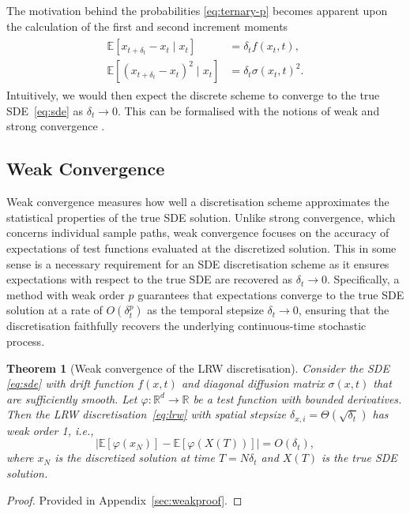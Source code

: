 \documentclass[pra,showpacs,amsmath,amssymb,amsfonts,lengthcheck,longbibliography,onecolumn]{revtex4-2}
\newcommand{\E}{\mathbb{E}}
\newtheorem{theorem}{Theorem}
\begin{document}
The motivation behind the probabilities \eqref{eq:ternary-p} becomes apparent upon the calculation of the first and second increment moments
\begin{align}\label{eq:ternary-moments}
\begin{split}
    \E[x_{t+\delta_t} - x_t \mid x_t] &= \delta_t f(x_t, t), \\
    \E[(x_{t+\delta_t} - x_t)^2 \mid x_t] &= \delta_t\sigma(x_t, t)^2.
\end{split}
\end{align}
Intuitively, we would then expect the discrete scheme to converge to the true SDE~\eqref{eq:sde} as $\delta_t \to 0$. This can be formalised with the notions of weak and strong convergence \cite{kloeden1992stochastic, pavliotis2014stochastic}.

\subsection{Weak Convergence}\label{subsec:weak_convergence}
Weak convergence measures how well a discretisation scheme approximates the statistical
properties of the true SDE solution. Unlike strong convergence, which concerns individual
sample paths, weak convergence
focuses on the accuracy of expectations of test functions evaluated at the discretized
solution. This in some sense is a necessary requirement for an SDE discretisation scheme
as it ensures expectations with respect to the true SDE are recovered as $\delta_t \to 0$.
Specifically, a method with weak order $p$ guarantees that expectations converge to the true SDE
solution at a rate of $O(\delta_t^p)$ as the temporal stepsize $\delta_t \to 0$, ensuring
that the discretisation faithfully recovers the underlying continuous-time stochastic process.

\begin{theorem}[Weak convergence of the LRW discretisation]
Consider the SDE \eqref{eq:sde} with drift function $f(x,t)$ and diagonal diffusion
matrix $\sigma(x,t)$ that are sufficiently smooth.
Let $\varphi: \mathbb{R}^d \to \mathbb{R}$ be a test function with bounded derivatives. 
Then the LRW discretisation~\eqref{eq:lrw} with spatial stepsize
$\delta_{x, i} = \Theta(\sqrt{\delta_t})$ has weak order 1, i.e.,
\[
\bigl|\E[\varphi(x_N)] - \E[\varphi(X(T))]\bigr| = O(\delta_t),
\]
where $x_N$ is the discretized solution at time $T = N\delta_t$ and $X(T)$ is the true SDE solution.
\end{theorem}
\begin{proof}
    Provided in Appendix~\ref{sec:weakproof}.
\end{proof}
\end{document}

